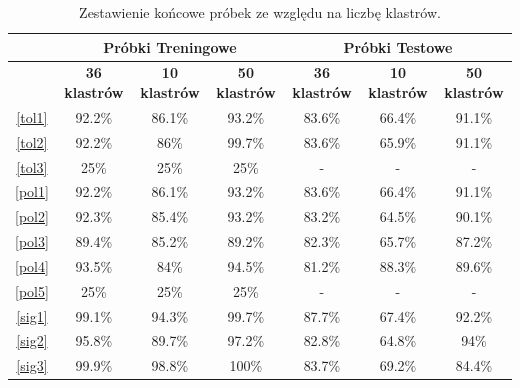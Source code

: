 \begin{table} [h!]
	\centering
	\begin{tabular}{|c|c|c|c|c|c|c|}
		\hline
		\multirow{2}{*}{} & \multicolumn{3}{|c|}{Próbki Treningowe} & \multicolumn{3}{|c|}{Próbki Testowe} \\ \hline	
		& \textbf{36 klastrów} & \textbf{10 klastrów} & \textbf{50 klastrów} & \textbf{36 klastrów} & \textbf{10 klastrów} & \textbf{50 klastrów} \\ \hline
		
		\ref{tol1} 	& 92.2\% 	& 86.1\%	& 93.2\% 	& 83.6\%  	& 66.4\% 	& 91.1\% \\ \hline
		\ref{tol2} 	& 92.2\% 	& 86\%		& 99.7\% 	& 83.6\% 	& 65.9\% 	& 91.1\% \\ \hline
		\ref{tol3}	& 25\%		& 25\%		& 25\%	 	& - 		& - 		& - \\ \hline \hline
		\ref{pol1} 	& 92.2\% 	& 86.1\%	& 93.2\% 	& 83.6\% 	& 66.4\% 	& 91.1\% \\ \hline
		\ref{pol2} 	& 92.3\% 	& 85.4\%	& 93.2\% 	& 83.2\% 	& 64.5\% 	& 90.1\% \\ \hline
		\ref{pol3}	& 89.4\%	& 85.2\%	& 89.2\%	& 82.3\% 	& 65.7\% 	& 87.2\% \\ \hline
		\ref{pol4}	& 93.5\%	& 84\%		& 94.5\%	& 81.2\% 	& 88.3\% 	& 89.6\% \\ \hline
		\ref{pol5}	& 25\%		& 25\%		& 25\%		& -  		& - 		& - \\\hline \hline
		\ref{sig1}	& 99.1\% 	& 94.3\%	& 99.7\% 	& 87.7\% 	& 67.4\% 	& 92.2\% \\ \hline
		\ref{sig2}	& 95.8\% 	& 89.7\%	& 97.2\% 	& 82.8\% 	& 64.8\% 	& 94\% \\ \hline
		\ref{sig3}	& 99.9\%	& 98.8\%	& 100\%	 	& 83.7\% 	& 69.2\% 	& 84.4\% \\ \hline
	\end{tabular}
	\caption{Zestawienie końcowe próbek ze względu na liczbę klastrów.}
	\label{tab: traintest}
\end{table}


